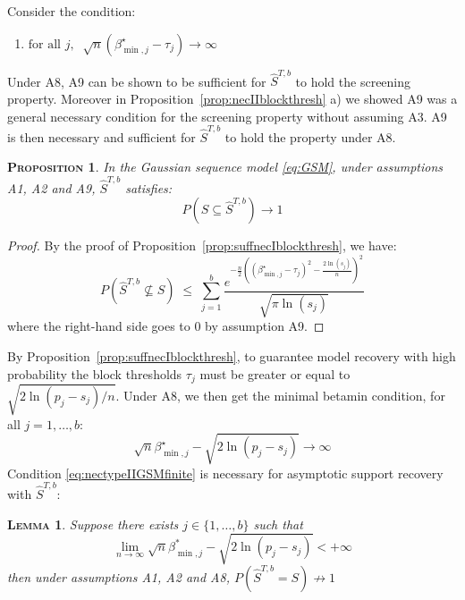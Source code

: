 \documentclass[aos]{imsart}
\theoremstyle{plain}
\newtheorem{prop}{\textsc{Proposition}}[section]
\newtheorem{lem}{\textsc{Lemma}}[section]
\begin{document}
Consider the condition:
\begin{enumerate}[start=9,label={(A\arabic*)}]
    \item $\text{for all } j, \;\; \sqrt{n}(\beta_{\min,j}^{\star}-\tau_j) \to \infty$
\end{enumerate}
Under A8, A9 can be shown to be sufficient for $\hat{S}^{T,b}$ to hold the screening property. Moreover in Proposition~\ref{prop:necIIblockthresh} a) we showed A9 was a general necessary condition for the screening property without assuming A3. A9 is then necessary and sufficient for $\hat{S}^{T,b}$ to hold the property under A8.
\begin{prop}\label{prop:suffnecIIblockthreshbis}
 In the Gaussian sequence model \eqref{eq:GSM}, under assumptions A1, A2 and A9, $\hat{S}^{T,b}$ satisfies:
$$P(S\subseteq \hat{S}^{T,b} ) \to 1$$
\end{prop}
\begin{proof}
    By the proof of Proposition~\ref{prop:suffnecIblockthresh}, we have: \begin{equation*}
P\left(\hat{S}^{T,b} \not\subseteq S\right)\;\leq\; \sum_{j=1}^b\frac{e^{-\tfrac{n}{2}\left((\beta^\star_{\min,j}-\tau_j)^2-\tfrac{2\ln(s_j)}{n}\right)^2}}{\sqrt{\pi\ln(s_j)}}
 \end{equation*}
 where the right-hand side goes to 0 by assumption A9.
\end{proof}
By Proposition~\ref{prop:suffnecIblockthresh}, to guarantee model recovery with high probability the block thresholds $\tau_j$ must be greater or equal to $\sqrt{2\ln(p_j-s_j)/n}$. Under A8, we then get the minimal betamin condition, for all $j=1,\ldots,b$:
\begin{equation}\label{eq:nectypeIIGSMfinite}
    \sqrt{n}\beta_{\min,j}^{\star}-\sqrt{2\ln(p_j-s_j)} \to \infty
\end{equation}
Condition \eqref{eq:nectypeIIGSMfinite} is necessary for asymptotic support recovery with $\hat{S}^{T,b}$:
\begin{lem}\label{lem:necbetaminblockthresh2}
    Suppose there exists $j\in\{1,\ldots,b\}$ such that
    \begin{equation}\label{eq:necbetaminblockthreshbis}
      \lim_{n\to \infty}\sqrt{n}\beta_{\min,j}^*-\sqrt{2\ln(p_j-s_j)} < +\infty  
    \end{equation}
then under assumptions A1, A2 and A8,\;  $P(\hat{S}^{T,b} = S)\not \to 1$
\end{lem}
\end{document}
